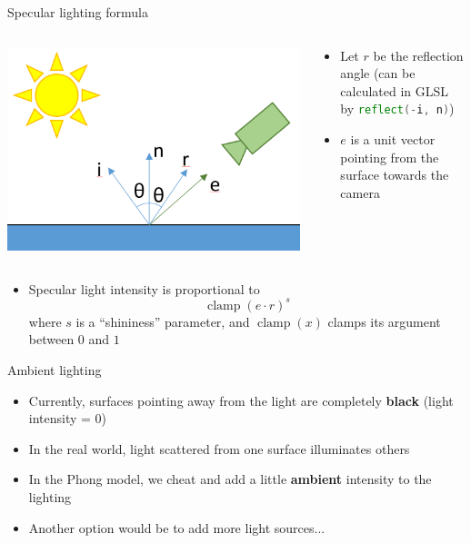 \begin{frame}{Specular lighting formula}
	\begin{columns}
		\begin{column}{0.33\textwidth}
			\includegraphics[width=\textwidth]{specular_angle}
		\end{column}
		\begin{column}{0.65\textwidth}
			\begin{itemize}
				\pause\item Let $r$ be the reflection angle (can be calculated in GLSL by \lstinline[language=GLSL]{reflect(-i, n)})
				\pause\item $e$ is a unit vector pointing from the surface towards the camera
			\end{itemize}
		\end{column}
	\end{columns}
	\begin{itemize}
		\pause\item Specular light intensity is proportional to
		$$ \operatorname{clamp}(e \cdot r)^s $$
		where $s$ is a ``shininess'' parameter, and $\operatorname{clamp}(x)$ clamps its argument between $0$ and $1$
	\end{itemize}
\end{frame}

\begin{frame}{Ambient lighting}
	\begin{itemize}
		\pause\item Currently, surfaces pointing away from the light are completely \textbf{black} (light intensity = 0)
		\pause\item In the real world, light scattered from one surface illuminates others
		\pause\item In the Phong model, we cheat and add a little \textbf{ambient} intensity to the lighting
		\pause\item Another option would be to add more light sources...
	\end{itemize}
\end{frame}

